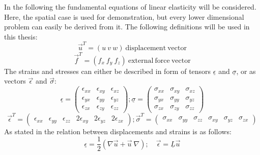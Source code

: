 \documentclass[11pt,twoside]{scrartcl}
\begin{document}
 In the following the fundamental equations of linear elasticity will be considered. Here, the spatial case is used for demonstration, but every lower dimensional problem can easily be derived from it.
 The following definitions will be used in this thesis:
 \begin{equation}
 \vec{u}^T = \left(u\ v\ w\right)\ \mathrm{displacement\ vector}
 \end{equation}
 \begin{equation}
 \vec{f}^T = \left(f_x\ f_y\ f_z\right)\ \mathrm{external\ force\ vector}
 \end{equation}
 The strains and stresses can either be described in form of tensors $\underline{\epsilon}$ and $\underline{\sigma}$, or as vectors $\vec{\epsilon}$ and $\vec{\sigma}$:
 \begin{equation}
 \underline{\epsilon} = \begin{pmatrix}
 \epsilon_{xx} & \epsilon_{xy} & \epsilon_{xz} \\
 \epsilon_{yx} & \epsilon_{yy} & \epsilon_{yz} \\
 \epsilon_{zx} & \epsilon_{zy} & \epsilon_{zz} \end{pmatrix};
 \underline{\sigma} = \begin{pmatrix}
 \sigma_{xx} & \sigma_{xy} & \sigma_{xz} \\
 \sigma_{yx} & \sigma_{yy} & \sigma_{yz} \\
 \sigma_{zx} & \sigma_{zy} & \sigma_{zz} \end{pmatrix}
 \end{equation}
 \begin{equation}
 \vec{\epsilon}^T = \begin{pmatrix}
 \epsilon_{xx} & \epsilon_{yy} & \epsilon_{zz} & 2\epsilon_{xy} & 2\epsilon_{yz} & 2\epsilon_{zx} \end{pmatrix};
 \vec{\sigma}^T = \begin{pmatrix}
 \sigma_{xx} & \sigma_{yy} & \sigma_{zz} & \sigma_{xy} & \sigma_{yz} & \sigma_{zx} \end{pmatrix}
 \end{equation}
 As stated in \cite{steinke2005finite} the relation between displacements and strains is as follows:
 \begin{equation}\label{eq:displ_strain_relation}
 \underline{\epsilon} = \frac{1}{2}\left(\nabla\vec{u} + \vec{u}\:\nabla \right);\quad \vec{\epsilon}
 = \underline{L}\vec{u}
 \end{equation}
\end{document}
